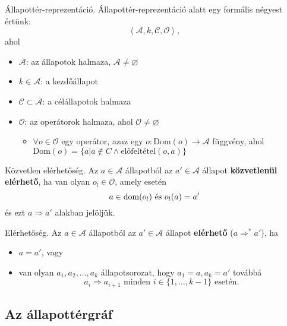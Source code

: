 \begin{definicio}
    Állapottér-reprezentáció.
    Állapottér-reprezentáció alatt egy formális négyest értünk: \[
        \left< \mathcal{A}, k, \mathcal{C}, \mathcal{O} \right>
    ,\] ahol \begin{itemize}
    \item $\mathcal{A}$: az állapotok halmaza, $\mathcal{A} \neq \varnothing$
    \item $k \in \mathcal{A}$: a kezdőállapot
    \item $\mathcal{C} \subset \mathcal{A}$: a célállapotok halmaza
    \item $\mathcal{O}$: az operátorok halmaza, ahol $\mathcal{O} \neq \varnothing$
        \begin{itemize}
            \item $\forall o \in \mathcal{O}$ egy operátor, azaz egy $o :
                \text{Dom}(o) \to \mathcal{A}$ függvény, ahol $\text{Dom}(o) =
                \{a | a \not\in C \land \text{előfeltétel}(o,a)\}$
        \end{itemize}
    \end{itemize}
\end{definicio}

\begin{definicio}
    Közvetlen elérhetőség.
    Az $a \in \mathcal{A}$ állapotból az $a' \in \mathcal{A}$ állapot
    \textbf{közvetlenül elérhető}, ha van olyan $o_l \in \mathcal{O}$,
    amely esetén \[
        a \in \operatorname{dom}(o_l) \text{  és  } o_l(a) = a'
    \]
    és ezt $a \Rightarrow a'$ alakban jelöljük.
\end{definicio}

\begin{definicio}
    Elérhetőség.
    Az $a \in \mathcal{A}$ állapotból az $a' \in \mathcal{A}$ állapot
    \textbf{elérhető} ($a \Rightarrow^* a'$), ha
    \begin{itemize}
        \item $a=a'$, vagy
        \item van olyan  $a_1, a_2, \ldots, a_k$ állapotsorozat, hogy
            $a_1=a, a_k=a'$ továbbá \[
                a_i \Rightarrow a_{i+1} \text{ minden }
                i \in \{1, \ldots, k-1\} \text{ esetén}
            .\]
    \end{itemize}
\end{definicio}

\subsection{Az állapottérgráf}

